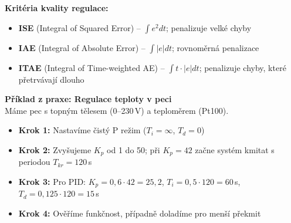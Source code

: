 \documentclass[a4paper,10pt]{article}
\begin{document}
\begin{vysvetlenibox}
\textbf{Kritéria kvality regulace:}
\begin{itemize}[noitemsep, leftmargin=1.4em, topsep=4pt]
    \item \textbf{ISE} (Integral of Squared Error) -- $\int e^2 dt$;
          penalizuje velké chyby
    \item \textbf{IAE} (Integral of Absolute Error) -- $\int |e| dt$;
          rovnoměrná penalizace
    \item \textbf{ITAE} (Integral of Time-weighted AE) -- $\int t \cdot |e| dt$;
          penalizuje chyby, které přetrvávají dlouho
\end{itemize}

\begin{center}
\end{center}

\textbf{Příklad z praxe: Regulace teploty v peci}\\
Máme pec s topným tělesem (0--230\,V) a teploměrem (Pt100).
\begin{itemize}[noitemsep, leftmargin=1.4em, topsep=4pt]
    \item \textbf{Krok 1:} Nastavíme čistý P režim ($T_i=\infty$, $T_d=0$)
    \item \textbf{Krok 2:} Zvyšujeme $K_p$ od 1 do 50; při $K_p=42$ začne systém
          kmitat s periodou $T_{kr} = 120$\,s
    \item \textbf{Krok 3:} Pro PID: $K_p = 0{,}6 \cdot 42 = 25{,}2$,
          $T_i = 0{,}5 \cdot 120 = 60$\,s, $T_d = 0{,}125 \cdot 120 = 15$\,s
    \item \textbf{Krok 4:} Ověříme funkčnost, případně doladíme pro menší překmit
\end{itemize}
\end{vysvetlenibox}


\end{document}

